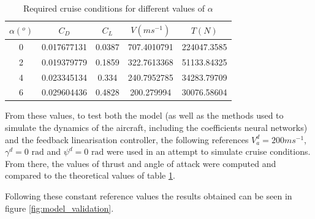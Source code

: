 \begin{table}[htbp]
  \centering
  \caption{Required cruise conditions for different values of $\alpha$}
    \begin{tabular}{ccccc}
    \toprule
    $\alpha (^o)$ & $C_D$ & $C_L$ & $V (ms^{-1})$ & $T (N)$ \\
    \midrule
    0     & 0.017677131 & 0.0387 & 707.4010791 & 224047.3585 \\
    2     & 0.019379779 & 0.1859 & 322.7613368 & 51133.84325 \\
    4     & 0.023345134 & 0.334 & 240.7952785 & 34283.79709 \\
    6     & 0.029604436 & 0.4828 & 200.279994 & 30076.58604 \\
    \bottomrule

    \end{tabular}
  \label{tab:cruise_cond}%
\end{table}%

From these values, to test both the model (as well as the methods used to simulate the dynamics of the aircraft, including the coefficients neural networks) and the feedback linearisation controller, the following references $V_a^d=200 ms^{-1}$, $\gamma^d = 0\text{ rad}$ and $\psi^d=0\text{ rad}$ were used in an attempt to simulate cruise conditions. From there, the values of thrust and angle of attack were computed and  compared to the theoretical values of table \ref{tab:cruise_cond}.
 
Following these constant reference values the results obtained can be seen in figure \ref{fig:model_validation}.

